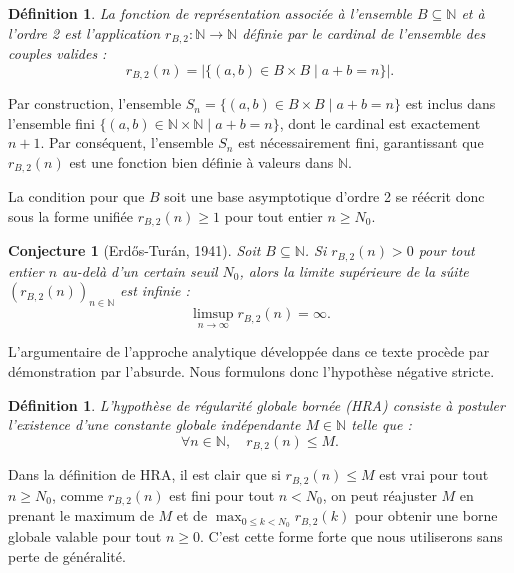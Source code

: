\documentclass[12pt,a4paper]{article}
\newtheorem{definition}[theorem]{D\'efinition}
\newtheorem{conjecture}[theorem]{Conjecture}
\begin{document}
\begin{definition}
La fonction de repr\'esentation associ\'ee \`a l'ensemble $B \subseteq \mathbb{N}$ et \`a l'ordre 2 est l'application $r_{B,2} : \mathbb{N} \to \mathbb{N}$ d\'efinie par le cardinal de l'ensemble des couples valides :
\begin{equation}
r_{B,2}(n) = \left| \{ (a, b) \in B \times B \mid a + b = n \} \right|.
\end{equation}
\end{definition}

Par construction, l'ensemble $S_n = \{ (a, b) \in B \times B \mid a + b = n \}$ est inclus dans l'ensemble fini $\{ (a, b) \in \mathbb{N} \times \mathbb{N} \mid a + b = n \}$, dont le cardinal est exactement $n + 1$. Par cons\'equent, l'ensemble $S_n$ est n\'ecessairement fini, garantissant que $r_{B,2}(n)$ est une fonction bien d\'efinie \`a valeurs dans $\mathbb{N}$.

La condition pour que $B$ soit une base asymptotique d'ordre 2 se r\'e\'ecrit donc sous la forme unifi\'ee $r_{B,2}(n) \ge 1$ pour tout entier $n \ge N_0$.

\begin{conjecture}[Erd\H{o}s-Tur\'an, 1941]
Soit $B \subseteq \mathbb{N}$. Si $r_{B,2}(n) > 0$ pour tout entier $n$ au-del\`a d'un certain seuil $N_0$, alors la limite sup\'erieure de la s\'uite $(r_{B,2}(n))_{n \in \mathbb{N}}$ est infinie :
\begin{equation}
\limsup_{n \to \infty} r_{B,2}(n) = \infty.
\end{equation}
\end{conjecture}

L'argumentaire de l'approche analytique d\'evelopp\'ee dans ce texte proc\`ede par d\'emonstration par l'absurde. Nous formulons donc l'hypoth\`ese n\'egative stricte.

\begin{definition}
L'hypoth\`ese de r\'egularit\'e globale born\'ee (HRA) consiste \`a postuler l'existence d'une constante globale ind\'ependante $M \in \mathbb{N}$ telle que :
\begin{equation}
\forall n \in \mathbb{N}, \quad r_{B,2}(n) \le M.
\end{equation}
\end{definition}

Dans la d\'efinition de HRA, il est clair que si $r_{B,2}(n) \le M$ est vrai pour tout $n \ge N_0$, comme $r_{B,2}(n)$ est fini pour tout $n < N_0$, on peut r\'eajuster $M$ en prenant le maximum de $M$ et de $\max_{0 \le k < N_0} r_{B,2}(k)$ pour obtenir une borne globale valable pour tout $n \ge 0$. C'est cette forme forte que nous utiliserons sans perte de g\'en\'eralit\'e.
\end{document}
